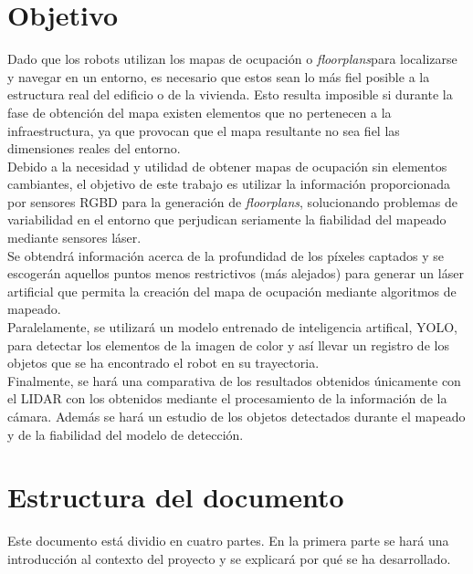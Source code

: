 \section{Objetivo}

Dado que los robots utilizan los mapas de ocupación o \textit{floorplans}para localizarse y navegar en un entorno, es necesario que estos sean lo más fiel posible a la estructura real del edificio o de la vivienda. Esto resulta imposible si durante la fase de obtención del mapa existen elementos que no pertenecen a la infraestructura, ya que provocan que el mapa resultante no sea fiel las dimensiones reales del entorno.\\

Debido a la necesidad y utilidad de obtener mapas de ocupación sin elementos cambiantes, el objetivo de este trabajo es utilizar la información proporcionada por sensores RGBD para la generación de \textit{floorplans}, solucionando problemas de variabilidad en el entorno que perjudican seriamente la fiabilidad del mapeado mediante sensores láser.\\

Se obtendrá información acerca de la profundidad de los píxeles captados y se escogerán aquellos puntos menos restrictivos (más alejados) para generar un láser artificial que permita la creación del mapa de ocupación mediante algoritmos de mapeado.\\

Paralelamente, se utilizará un modelo entrenado de inteligencia artifical, YOLO, para detectar los elementos de la imagen de color y así llevar un registro de los objetos que se ha encontrado el robot en su trayectoria.\\

Finalmente, se hará una comparativa de los resultados obtenidos únicamente con el LIDAR con los obtenidos mediante el procesamiento de la información de la cámara. Además se hará un estudio de los objetos detectados durante el mapeado y de la fiabilidad del modelo de detección. \\

\section{Estructura del documento}

Este documento está dividio en cuatro partes. En la primera parte se hará una introducción al contexto del proyecto y se explicará por qué se ha desarrollado.\\

